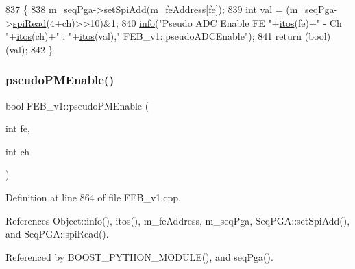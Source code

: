 \begin{DoxyCode}
837                                              \{
838   \hyperlink{classFEB__v1_a6c7804ac86796f233a8393043adf2e77}{m\_seqPga}->\hyperlink{classSeqPGA_ac998ce3a6d9b5f2e88cc8393f8c1df53}{setSpiAdd}(\hyperlink{classFEB__v1_a4e1945c2d5b434125f375e9d0fc6d99f}{m\_feAddress}[fe]);
839   \textcolor{keywordtype}{int} val = (\hyperlink{classFEB__v1_a6c7804ac86796f233a8393043adf2e77}{m\_seqPga}->\hyperlink{classSeqPGA_ab3d0e5e5d4014bc7a92588a76b8713d4}{spiRead}(4+ch)>>10)&1;
840   \hyperlink{classObject_a644fd329ea4cb85f54fa6846484b84a8}{info}(\textcolor{stringliteral}{"Pseudo ADC Enable FE "}+\hyperlink{Tools_8h_af330027dbdafb9a30768b3613c553e60}{itos}(fe)+\textcolor{stringliteral}{" - Ch "}+\hyperlink{Tools_8h_af330027dbdafb9a30768b3613c553e60}{itos}(ch)+\textcolor{stringliteral}{" : "}+\hyperlink{Tools_8h_af330027dbdafb9a30768b3613c553e60}{itos}(val),\textcolor{stringliteral}{"
      FEB\_v1::pseudoADCEnable"});
841   \textcolor{keywordflow}{return} (\textcolor{keywordtype}{bool})(val);
842 \}
\end{DoxyCode}
\mbox{\label{classFEB__v1_ab6b076d6e1372bfa8d9fd2916b1b52cd}} 
\subsubsection{\texorpdfstring{pseudo\+P\+M\+Enable()}{pseudoPMEnable()}}
{\footnotesize\ttfamily bool F\+E\+B\+\_\+v1\+::pseudo\+P\+M\+Enable (\begin{DoxyParamCaption}\item[{int}]{fe,  }\item[{int}]{ch }\end{DoxyParamCaption})}



Definition at line 864 of file F\+E\+B\+\_\+v1.\+cpp.



References Object\+::info(), itos(), m\+\_\+fe\+Address, m\+\_\+seq\+Pga, Seq\+P\+G\+A\+::set\+Spi\+Add(), and Seq\+P\+G\+A\+::spi\+Read().



Referenced by B\+O\+O\+S\+T\+\_\+\+P\+Y\+T\+H\+O\+N\+\_\+\+M\+O\+D\+U\+L\+E(), and seq\+Pga().


